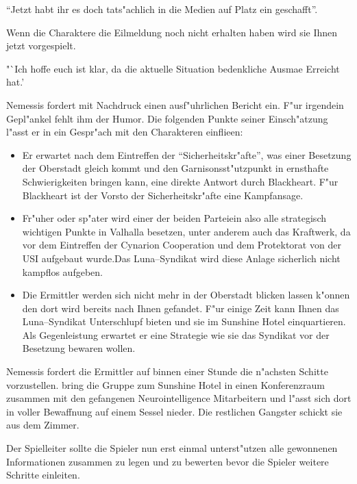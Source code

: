 "`Jetzt habt ihr es doch tats"achlich in die Medien auf Platz ein geschafft"'. 

Wenn die Charaktere die Eilmeldung noch nicht erhalten haben wird sie Ihnen jetzt vorgespielt.

"`Ich hoffe euch ist klar, da\3 die aktuelle Situation bedenkliche Ausma\3e Erreicht hat.'

Nemessis fordert mit Nachdruck einen ausf"uhrlichen Bericht ein. F"ur irgendein Gepl"ankel fehlt ihm der Humor. Die folgenden Punkte seiner Einsch"atzung l"asst er in ein Gespr"ach mit den Charakteren einflie\3en:

\begin{itemize}
	\item Er erwartet nach dem Eintreffen der "`Sicherheitskr"afte"', was einer Besetzung der Oberstadt gleich kommt und den 			
		Garnisonsst"utzpunkt in ernsthafte Schwierigkeiten bringen kann, eine direkte Antwort durch Blackheart. F"ur Blackheart ist der Vorsto\3 der Sicherheitskr"afte eine Kampfansage.
	\item Fr"uher oder sp"ater wird einer der beiden Parteiein also alle strategisch wichtigen Punkte in Valhalla besetzen, unter anderem 	
		auch das Kraftwerk, da\3 vor dem Eintreffen der Cynarion Cooperation und dem Protektorat von der USI aufgebaut wurde.Das Luna--Syndikat wird diese Anlage sicherlich nicht kampflos aufgeben.
	\item Die Ermittler werden sich nicht mehr in der Oberstadt blicken lassen k"onnen den dort wird bereits nach Ihnen gefandet. F"ur 
		einige Zeit kann Ihnen das Luna--Syndikat Unterschlupf bieten und sie im Sunshine Hotel einquartieren. Als Gegenleistung erwartet er eine Strategie wie sie das Syndikat vor der Besetzung bewaren wollen.
\end{itemize}

Nemessis fordert die Ermittler auf binnen einer Stunde die n"achsten Schitte vorzustellen. \xl{} bring die Gruppe zum Sunshine Hotel in einen Konferenzraum zusammen mit den gefangenen Neurointelligence Mitarbeitern und l"asst sich dort in voller Bewaffnung auf einem Sessel nieder. Die restlichen Gangster schickt sie aus dem Zimmer.

Der Spielleiter sollte die Spieler nun erst einmal unterst"utzen alle gewonnenen Informationen zusammen zu legen und zu bewerten bevor die Spieler weitere Schritte einleiten. 

